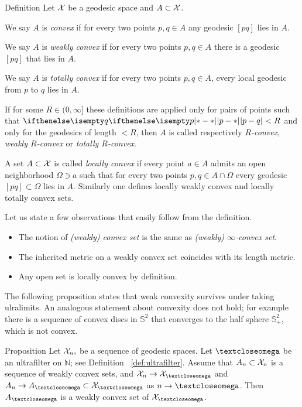 \begin{thm}{Definition} 
\label{def:convex-set}
Let $\mathcal{X}$ be a geodesic space and $A\subset\spc{X}$.

We say $A$ is 
\emph{convex}%
if for every two points $p,q\in A$ any geodesic $[pq]$ lies in $A$.

We say $A$ is 
\emph{weakly convex}%
if for every two points $p,q\in A$
there is a geodesic $[pq]$ 
that lies in $A$.

We say  $A$ is 
\emph{totally convex}
if for every two points $p,q\in A$, every local geodesic from $p$ to $q$ lies in $A$.

If for some $R\in (0,\infty]$ these definitions are applied only for pairs of points such that $\dist{p}{q}{}<R$ and only for the geodesics of length $<R$,
then $A$ is called respectively 
\emph{$R$-convex},%
\emph{weakly  $R$-convex}%
or \emph{totally  $R$-convex}.

A set $A\subset\spc{X}$ is called 
\emph{locally convex}%
if every point $a\in A$ admits an open neighborhood $\Omega\ni a$
such that for every two points $p,q\in A\cap\Omega$ every geodesic $[pq]\subset \Omega$ lies in $A$.
Similarly one defines locally weakly convex and locally totally convex sets. %
\end{thm}

 Let us state a few observations that easily follow  from the definition.
\begin{itemize}
\item The notion of \emph{(weakly) convex set} is the same as {}\emph{(weakly) $\infty$-convex set}.
\item The inherited metric on a weakly convex set coincides with its length metric.
\item Any open set is locally convex by definition.
\end{itemize}

The following proposition states that weak convexity survives under taking ulralimits.
An analogous statement about convexity does not hold;
for example there is a sequence of convex discs in $\mathbb{S}^2$ that converges to the half sphere $\mathbb{S}^2_+$, which is not convex.

\begin{thm}{Proposition}\label{prop:weak-convex-stable}
Let $\mathcal{X}_n,$ be a sequence of geodesic spaces.
Let $\o$ be an ultrafilter on $\mathbb N$; see Definition ~\ref{def:ultrafilter}.
Assume that  $A_n\subset \spc{X}_n$ is a sequence of weakly convex sets, and 
$\spc{X}_n\to \spc{X}_\o$ and $A_n\to A_\o\subset \spc{X}_\o$ as $n\to\o$.
Then $A_\o$ is a weakly convex set of $\spc{X}_\o$.
\end{thm}

